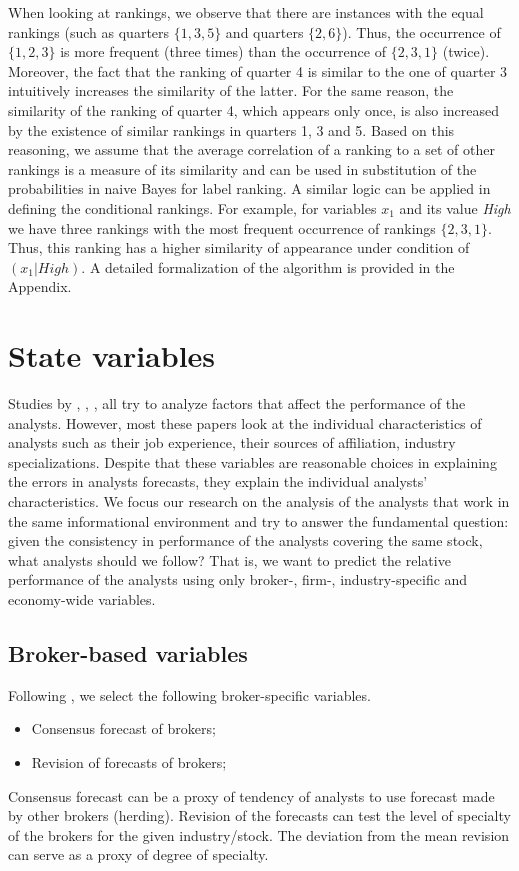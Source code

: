 When looking at rankings, we observe that there are instances with the equal rankings (such as quarters $\{1,3,5\}$ and quarters $\{2,6\}$). Thus, the occurrence of $\{1,2,3\}$ is more frequent (three times) than the occurrence of $\{2,3,1\}$ (twice). Moreover, the fact that the ranking of quarter 4 is similar to the one of quarter 3 intuitively increases the similarity of the latter. For the same reason, the similarity of the ranking of quarter 4, which appears only once, is also increased by the existence of similar rankings in quarters 1, 3 and 5. Based on this reasoning, we assume that the average correlation of a ranking to a set of other rankings is a measure of its similarity and can be used in substitution of the probabilities in naive Bayes for label ranking. A similar logic can be applied in defining the conditional rankings. For example, for variables $x_1$ and its value \textit{High} we have three rankings with the most frequent occurrence of rankings $\{2,3,1\}$. Thus, this ranking has a higher similarity of appearance under condition of $(x_1|High)$. A detailed formalization of the algorithm is provided in the Appendix.



\section{State variables}

Studies by \cite{clement1999}, \cite{brown2003}, \cite{jegadeesh2004}, all try to analyze  factors that affect the performance of the analysts.  However, most these papers look at the individual characteristics of analysts such as their job experience, their sources of affiliation,  industry specializations. Despite that these variables are reasonable choices in explaining the errors in analysts forecasts, they explain the individual analysts' characteristics. We focus our research on the analysis of the analysts that work in the same informational environment and try to answer the fundamental question: given the consistency in  performance of the  analysts covering the same stock, what analysts should we follow? That is, we want to predict the relative performance of the analysts using only broker-,  firm-, industry-specific and economy-wide variables. 
 
\subsection{Broker-based variables}
Following \cite{clement1999,clement2003,brown2001}, we select the following broker-specific variables.
\begin{itemize}
\item Consensus forecast of brokers;
\item  Revision of forecasts of brokers;
\end{itemize}
Consensus forecast can be a proxy of tendency of analysts to use forecast made by other brokers (herding). Revision of the forecasts can test the level of specialty of the brokers for the given industry/stock. The deviation from the mean revision can serve as a proxy of degree of specialty. 


